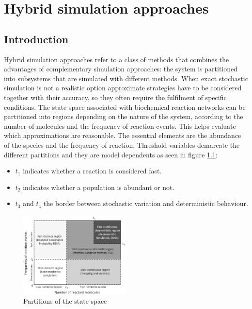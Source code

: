 \graphicspath{{chapters/06/images/}}
\chapter{Hybrid simulation approaches}

\section{Introduction}
Hybrid simulation approaches refer to a class of methods that combines the advantages of complementary simulation approaches: the system is partitioned into subsystems that are simulated with different methods.
When exact stochastic simulation is not a realistic option approximate strategies have to be considered together with their accuracy, so they often require the fulfilment of specific conditions.
The state space associated with biochemical reaction networks can be partitioned into regions depending on the nature of the system, according to the number of molecules and the frequency of reaction events.
This helps evaluate which approximations are reasonable.
The essential elements are the abundance of the species and the frequency of reaction.
Threshold variables demarcate the different partitions and they are model dependents as seen in figure \ref{fig:regions}:

\begin{multicols}{2}
  \begin{itemize}
    \item $t_1$ indicates whether a reaction is considered fast.
    \item $t_2$ indicates whether a population is abundant or not.
    \item $t_3$ and $t_4$ the border between stochastic variation and deterministic behaviour.
  \end{itemize}
\end{multicols}

\begin{figure}[H]
  \centering
  \includegraphics[width=0.5\textwidth]{regions.png}
  \caption{Partitions of the state space}
  \label{fig:regions}
\end{figure}

